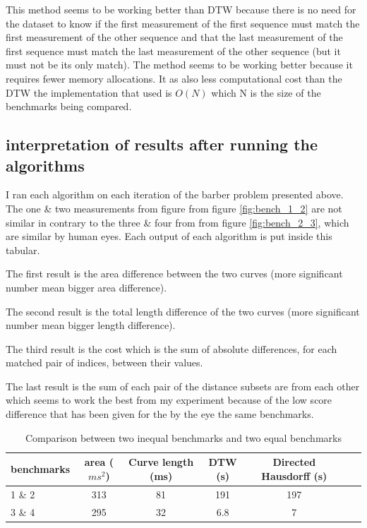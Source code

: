 \documentclass[12pt,a4paper]{article}
\begin{document}
This method seems to be working better than DTW because there is no need for the dataset to know if the first measurement of the first sequence must match the first measurement of the other sequence and that the last measurement of the first sequence must match the last measurement of the other sequence (but it must not be its only match). The method seems to be working better because it requires fewer memory allocations. It as also less computational cost than the DTW the implementation that used is $O(N)$ which N is the size of the benchmarks being compared.



\subsection{ interpretation of results after running the algorithms}

I ran each algorithm on each iteration of the barber problem presented above.
The one \& two measurements from figure from figure \ref{fig:bench_1_2}  are not similar in contrary to the three \& four from from figure \ref{fig:bench_2_3}, which are similar by human eyes.
Each output of each algorithm is put inside this tabular.


The first result is the area difference between the two curves (more significant number mean bigger area difference).

The second result is the total length difference of the two curves (more significant number mean bigger length difference).

The third result is the cost which is the sum of absolute differences, for each matched pair of indices, between their values.

The last result is the sum of each pair of the distance subsets are from each other which seems to work the best from my experiment because of the low score difference that has been given for the by the eye the same benchmarks.

\begin{table}[h!]
\begin{tabular}{|l|c|c|c|c|c|c|}
   \hline
   benchmarks  & area ($ms^2$) & Curve length (ms) & DTW (s) & Directed Hausdorff (s) \\
   \hline
   1 \&  2 & 313 & 81 & 191 & 197\\
   \hline
   3 \& 4  & 295 & 32 & 6.8  & 7 \\
   \hline
\end{tabular} \\ 
\caption{Comparison between two inequal benchmarks and two equal benchmarks}
\label{result}
\end{table}
\end{document}
